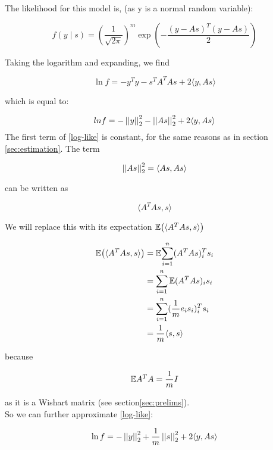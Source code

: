 The likelihood for this model is, (as y is a normal random variable):

\begin{equation}
f\left(y \mid s\right) = \left(\frac{1}{\sqrt{2\pi}} \right)^m \exp{\left( - \frac{\left(y-As\right)^T  \left(y-As\right)}{2} \right)}
\end{equation}

Taking the logarithm and expanding, we find

\begin{equation}
\ln{f} = -y^Ty - s^TA^TAs + 2\langle y, As \rangle
\end{equation}

which is equal to:

\begin{equation}
ln{f} = - \left|\left|y\right|\right|_2^2 - \left|\left|As\right|\right|_2^2 + 2\langle y, As \rangle
\label{log-like}
\end{equation}
The first term of \eqref{log-like} is constant, for the same reasons as in section \eqref{sec:estimation}. The term 

\begin{equation}
\left|\left|As\right|\right|^2_2 = \langle As, As\rangle
\end{equation}

can be written as 

\begin{equation}
\langle A^T As, s\rangle
\end{equation}

We will replace this with its expectation \({\mathbb{E}}{\left( \langle A^T As, s\rangle \right)}\)

\begin{align*}
{\mathbb{E}}{\left(\langle A^T As, s\rangle\right)} &=  {\mathbb{E}}{\sum_{i=1}^n (A^TAs)^T_i s_i} \\
&= \sum_{i=1}^n {\mathbb{E}}{(A^TAs)_i s_i} \\
&= \sum_{i=1}^n (\frac{1}{m}e_i s_i)^T_i s_i \\
&= \frac{1}{m} \langle s, s \rangle
\end{align*}

because

\begin{equation}
{\mathbb{E}}{A^TA} = \frac{1}{m}I
\end{equation}

as it is a Wishart matrix (see section\ref{sec:prelims}). 
\\
So we can further approximate \eqref{log-like}:

\begin{equation}
\ln{f} = - \left|\left|y\right|\right|_2^2 + \frac{1}{m}\left|\left|s\right|\right|_2^2 + 2\langle y, As \rangle
\label{approx-log-like}
\end{equation}

